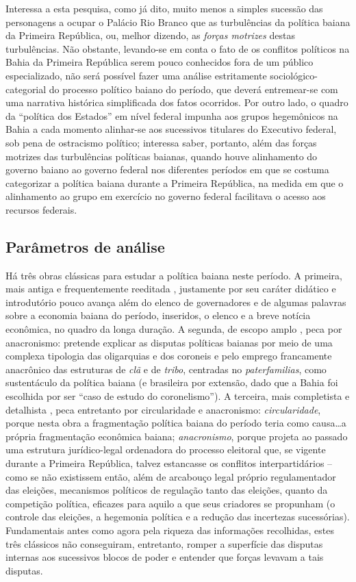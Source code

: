 Interessa a esta pesquisa, como já dito, muito menos a simples sucessão das personagens a ocupar o Palácio Rio Branco que as turbulências da política baiana da Primeira República, ou, melhor dizendo, as \textit{forças motrizes} destas turbulências. Não obstante, levando-se em conta o fato de os conflitos políticos na Bahia da Primeira República serem pouco conhecidos fora de um público especializado, não será possível fazer uma análise estritamente sociológico-categorial do processo político baiano do período, que deverá entremear-se com uma narrativa histórica simplificada dos fatos ocorridos. Por outro lado, o quadro da ``política dos Estados'' em nível federal impunha aos grupos hegemônicos na Bahia a cada momento alinhar-se aos sucessivos titulares do Executivo federal, sob pena de ostracismo político; interessa saber, portanto, além das forças motrizes das turbulências políticas baianas, quando houve alinhamento do governo baiano ao governo federal nos diferentes períodos em que se costuma categorizar a política baiana durante a Primeira República, na medida em que o alinhamento ao grupo em exercício no governo federal facilitava o acesso aos recursos federais.

\subsection{Parâmetros de análise}

Há três obras clássicas para estudar a política baiana neste período. A primeira, mais antiga e frequentemente reeditada \cite{TAVARES2008}, justamente por seu caráter didático e introdutório pouco avança além do elenco de governadores e de algumas palavras sobre a economia baiana do período, inseridos, o elenco e a breve notícia econômica, no quadro da longa duração. A segunda, de escopo amplo \cite{pang_coronelismo_1979}, peca por anacronismo: pretende explicar as disputas políticas baianas por meio de uma complexa tipologia das oligarquias e dos coroneis e pelo emprego francamente anacrônico das estruturas de \textit{clã} e de \textit{tribo}, centradas no \textit{paterfamilias}, como sustentáculo da política baiana (e brasileira por extensão, dado que a Bahia foi escolhida por ser ``caso de estudo do coronelismo''). A terceira, mais completista e detalhista \cite{sampaio_partidos_1978}, peca entretanto por circularidade e anacronismo: \textit{circularidade}, porque nesta obra a fragmentação política baiana do período teria como causa\dots a própria fragmentação econômica baiana; \textit{anacronismo}, porque projeta ao passado uma estrutura jurídico-legal ordenadora do processo eleitoral que, se vigente durante a Primeira República, talvez estancasse os conflitos interpartidários -- como se não existissem então, além de arcabouço legal próprio regulamentador das eleições, mecanismos políticos de regulação tanto das eleições, quanto da competição política, eficazes para aquilo a que seus criadores se propunham (o controle das eleições, a hegemonia política e a redução das incertezas sucessórias). Fundamentais antes como agora pela riqueza das informações recolhidas, estes três clássicos não conseguiram, entretanto, romper a superfície das disputas internas aos sucessivos blocos de poder e entender que forças levavam a tais disputas. 

